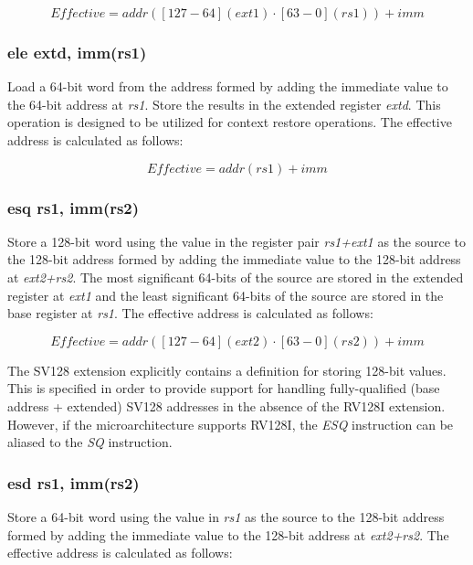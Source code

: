 \documentclass{article}
\begin{document}
\begin{equation}
Effective = addr([127-64](ext1) \cdot [63-0](rs1))+imm
\end{equation}

\subsubsection{ele extd, imm(rs1)}
Load a 64-bit word from the address formed by adding the immediate value to the 
64-bit address at \textit{rs1}.  Store the results in the extended register \textit{extd}.  
This operation is designed to be utilized for context restore operations.  The effective 
address is calculated as follows: 

\begin{equation}
Effective = addr(rs1)+imm
\end{equation}

\subsubsection{esq rs1, imm(rs2)}
Store a 128-bit word using the value in the register pair \textit{rs1+ext1} 
as the source to the 128-bit address formed by adding the immediate value to 
the 128-bit address at \textit{ext2+rs2}.  The most significant 64-bits of the source 
are stored in the extended register at \textit{ext1} and the least significant 64-bits of the source 
are stored in the base register at \textit{rs1}.  The effective address is calculated 
as follows:  

\begin{equation}
Effective = addr([127-64](ext2) \cdot [63-0](rs2))+imm
\end{equation}

\begin{commentary}
The SV128 extension explicitly contains a definition for storing 128-bit values.  
This is specified in order to provide support for handling fully-qualified (base 
address + extended) SV128 addresses in the absence of the RV128I extension.  However, 
if the microarchitecture supports RV128I, the \textit{ESQ} instruction can be aliased 
to the \textit{SQ} instruction.
\end{commentary}

\subsubsection{esd rs1, imm(rs2)}
Store a 64-bit word using the value in \textit{rs1} as the source 
to the 128-bit address formed by adding the immediate value to the 
128-bit address at \textit{ext2+rs2}.  The effective address is calculated 
as follows: 
\end{document}
